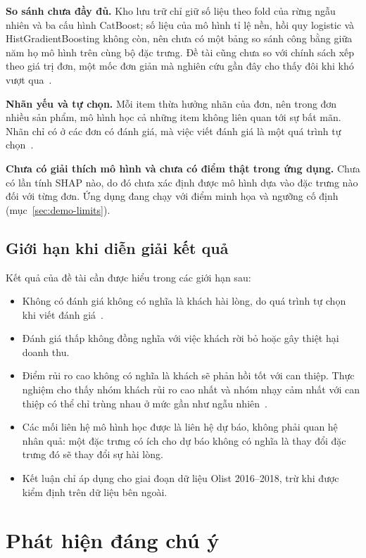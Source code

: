 \textbf{So sánh chưa đầy đủ.} Kho lưu trữ chỉ giữ số liệu theo fold của rừng ngẫu nhiên và ba cấu hình CatBoost; số liệu của mô hình tỉ lệ nền, hồi quy logistic và HistGradientBoosting không còn, nên chưa có một bảng so sánh công bằng giữa năm họ mô hình trên cùng bộ đặc trưng. Đề tài cũng chưa so với chính sách xếp theo giá trị đơn, một mốc đơn giản mà nghiên cứu gần đây cho thấy đôi khi khó vượt qua~\cite{li2026valuesorting}.

\textbf{Nhãn yếu và tự chọn.} Mỗi item thừa hưởng nhãn của đơn, nên trong đơn nhiều sản phẩm, mô hình học cả những item không liên quan tới sự bất mãn. Nhãn chỉ có ở các đơn có đánh giá, mà việc viết đánh giá là một quá trình tự chọn~\cite{li2008}.

\textbf{Chưa có giải thích mô hình và chưa có điểm thật trong ứng dụng.} Chưa có lần tính SHAP nào, do đó chưa xác định được mô hình dựa vào đặc trưng nào đối với từng đơn. Ứng dụng đang chạy với điểm minh họa và ngưỡng cố định (mục~\ref{sec:demo-limits}).

\subsection{Giới hạn khi diễn giải kết quả}

Kết quả của đề tài cần được hiểu trong các giới hạn sau:
\begin{itemize}
  \item Không có đánh giá không có nghĩa là khách hài lòng, do quá trình tự chọn khi viết đánh giá~\cite{li2008}.
  \item Đánh giá thấp không đồng nghĩa với việc khách rời bỏ hoặc gây thiệt hại doanh thu.
  \item Điểm rủi ro cao không có nghĩa là khách sẽ phản hồi tốt với can thiệp. Thực nghiệm cho thấy nhóm khách rủi ro cao nhất và nhóm nhạy cảm nhất với can thiệp có thể chỉ trùng nhau ở mức gần như ngẫu nhiên~\cite{ascarza2018}.
  \item Các mối liên hệ mô hình học được là liên hệ dự báo, không phải quan hệ nhân quả: một đặc trưng có ích cho dự báo không có nghĩa là thay đổi đặc trưng đó sẽ thay đổi sự hài lòng.
  \item Kết luận chỉ áp dụng cho giai đoạn dữ liệu Olist 2016--2018, trừ khi được kiểm định trên dữ liệu bên ngoài.
\end{itemize}

\section{Phát hiện đáng chú ý}\label{sec:disc-findings}

